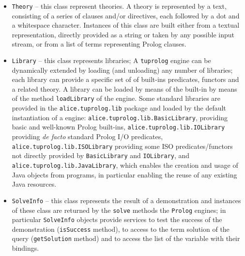 \begin{itemize}
    \item \texttt{Theory} -- this class represent \tuprolog{}
    theories.
    A theory is represented by a text, consisting of a series of
    clauses and/or directives, each followed by a dot and a
    whitespace character.
    Instances of this class are built either from a textual representation,
    directly provided as a string or taken by any possible input
    stream, or from a list of terms representing Prolog clauses.
    \item \texttt{Library} -- this class represents \tuprolog{}
    libraries;
    A \texttt{tuprolog} engine can be dynamically extended by loading
    (and unloading) any number of libraries; each library can provide
    a specific set of of built-ins predicates, functors and a related
    theory.
    A library can be loaded by means of the built-in by means of the method
    \texttt{loadLibrary} of the \tuprolog{} engine.
    Some standard libraries are provided in the
    \texttt{alice.tuprolog.lib} package and loaded by the default
    instantiation of a \tuprolog{} engine:
    \texttt{alice.tuprolog.lib.BasicLibrary}, providing basic and
    well-known Prolog built-ins, \texttt{alice.tuprolog.lib.IOLibrary}
    providing \textit{de facto} standard Prolog I/O predicates, \texttt{alice.tuprolog.lib.ISOLibrary}
    providing some ISO predicates/functors not directly provided
    by \texttt{BasicLibrary} and \texttt{IOLibrary}, and
    \texttt{alice.tuprolog.lib.JavaLibrary}, which enables the
    creation and usage of Java objects from \tuprolog{} programs,
    in particular enabling the reuse of any existing Java resources.
    \item \texttt{SolveInfo} -- this class represents the result of a
    demonstration and instances of these class are returned by the
    \texttt{solve} methods the \texttt{Prolog} engines;
    in particular \texttt{SolveInfo} objects provide services to test the
    success of the demonstration (\texttt{isSuccess} method),
    to access to the term solution of the query
    (\texttt{getSolution} method)  and to access the list of the
    variable with their bindings.
\end{itemize}
%


